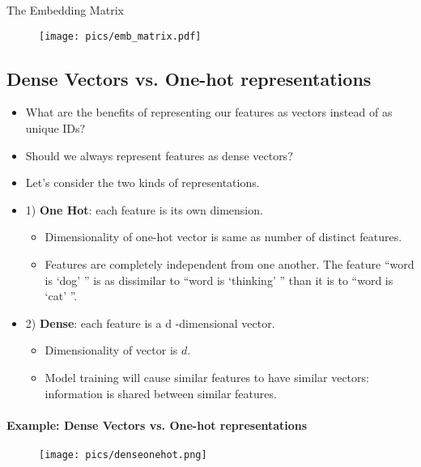 The Embedding Matrix
\begin{figure}[htb]
	\centering
	 \texttt{[image: pics/emb\_matrix.pdf]}
\end{figure}




\subsection{Dense Vectors vs. One-hot representations}

\begin{itemize}

\item What are the benefits of representing our features as vectors instead of as unique IDs?
\item Should we always represent features as dense vectors? 
\item Let's consider the two kinds of representations.

\item 1) \textbf{One Hot}: each feature is its own dimension. 
\begin{itemize}
\item Dimensionality of one-hot vector is same as number of distinct features.
\item Features are completely independent from one another. The feature ``word is `dog' '' is as dissimilar to ``word is `thinking' '' than it is to ``word is `cat' ''.
\end{itemize}
\item 2) \textbf{Dense}: each feature is a d -dimensional vector. 
\begin{itemize}
\item Dimensionality of vector is $d$.
\item Model training will cause similar features to have similar vectors: information is shared between similar features.
\end{itemize}
\end{itemize}


\paragraph{Example: Dense Vectors vs. One-hot representations}


\begin{figure}[htb]
	\centering
	 \texttt{[image: pics/denseonehot.png]}
\end{figure}

